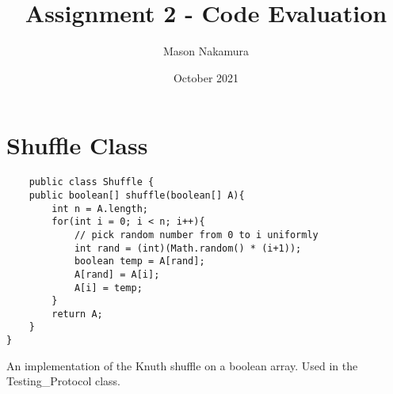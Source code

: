 \documentclass{article}
\title{Assignment 2 - Code Evaluation}
\author{Mason Nakamura}
\date{October 2021}
\begin{document}
\maketitle

\section{Shuffle Class}
    \begin{lstlisting}
    public class Shuffle {
    public boolean[] shuffle(boolean[] A){
        int n = A.length;
        for(int i = 0; i < n; i++){
            // pick random number from 0 to i uniformly
            int rand = (int)(Math.random() * (i+1));
            boolean temp = A[rand];
            A[rand] = A[i];
            A[i] = temp;
        }
        return A;
    }
}

\end{lstlisting}

An implementation of the Knuth shuffle on a boolean array. Used in the Testing\_Protocol class.
\end{document}
